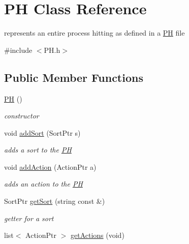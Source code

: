\hypertarget{class_p_h}{\section{\-P\-H \-Class \-Reference}
\label{class_p_h}
}


represents an entire process hitting as defined in a \hyperlink{class_p_h}{\-P\-H} file  




{\ttfamily \#include $<$\-P\-H.\-h$>$}

\subsection*{\-Public \-Member \-Functions}
\begin{DoxyCompactItemize}
\item 
\hypertarget{class_p_h_ae3ab2dd87b4bfadf04c1a14c6091aebc}{\hyperlink{class_p_h_ae3ab2dd87b4bfadf04c1a14c6091aebc}{\-P\-H} ()}\label{class_p_h_ae3ab2dd87b4bfadf04c1a14c6091aebc}

\begin{DoxyCompactList}\small\item\em constructor \end{DoxyCompactList}\item 
void \hyperlink{class_p_h_ad4335e01899c57e6802021f1afb83e7f}{add\-Sort} (\-Sort\-Ptr s)
\begin{DoxyCompactList}\small\item\em adds a sort to the \hyperlink{class_p_h}{\-P\-H} \end{DoxyCompactList}\item 
void \hyperlink{class_p_h_ae9bed9356d272f3c43f2147d6d8e5906}{add\-Action} (\-Action\-Ptr a)
\begin{DoxyCompactList}\small\item\em adds an action to the \hyperlink{class_p_h}{\-P\-H} \end{DoxyCompactList}\item 
\hypertarget{class_p_h_a02f1cd90c270555a50c08caa0fb2d491}{\-Sort\-Ptr \hyperlink{class_p_h_a02f1cd90c270555a50c08caa0fb2d491}{get\-Sort} (string const \&)}\label{class_p_h_a02f1cd90c270555a50c08caa0fb2d491}

\begin{DoxyCompactList}\small\item\em getter for a sort \end{DoxyCompactList}\item 
\hypertarget{class_p_h_ae9861660fe017ab285451b2ac8e191a4}{list$<$ \-Action\-Ptr $>$ \hyperlink{class_p_h_ae9861660fe017ab285451b2ac8e191a4}{get\-Actions} (void)}\label{class_p_h_ae9861660fe017ab285451b2ac8e191a4}


\end{DoxyCompactItemize}
